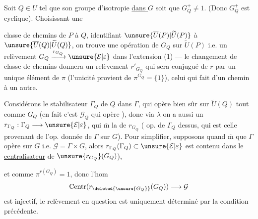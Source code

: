 Soit  $Q\in U$ tel que son groupe d'isotropie   \uline{dans $G$} soit  que $G_Q^+\ne1$.
(Donc $G_Q^+$ est cyclique). Choisissant une


classe de chemins \inserted{$\lambda$} de $P$ à $Q$, identifiant $\unsure{\overline U(P)|\widetilde U(P)}$ à $\unsure{\overline U(Q)|\widetilde U(Q)}$, on trouve une opération de $G_Q$ sur $\widetilde U(P)$ i.e. un relèvement $G_Q\xrightarrow{r_{G_Q}}\unsure{\mathcal E|\varepsilon}$ dans l'extension (1) --- le changement de classe de chemins  donnera un relèvement $r'_{G_Q}$ qui  sera conjugué de $r$ par un unique élément de $\pi$  (l'unicité provient de $\pi^{G_Q}=\{1\}$),  celui qui fait  d'un chemin à un autre.

Considérons le stabilisateur $\Gamma_Q$ de $Q$ dans $\Gamma$,  qui opère bien sûr sur $\widetilde U(Q)$ tout comme $G_Q$ (en fait c'est $\mathcal G_Q$ qui opère  \unsure{\dots}), donc via $\lambda$ on a aussi un  $r_{\Gamma_Q}:\Gamma_Q\longrightarrow\unsure{\mathcal E|\varepsilon}$, qui  $\overline{\mathrm m}$ la  de  $r_{G_Q}$ ( op. de  $\Gamma_Q$ dessus, qui est celle provenant de l'op. donnée de $\Gamma$ sur $G$).
Pour simplifier, supposons quand $\overline{\mathrm m}$ que $\Gamma$ opère  sur $G$ i.e. $\mathcal G=\Gamma\times G$, alors $r_{\Gamma_Q}(\Gamma_Q)\subset\unsure{\mathcal E|\varepsilon}$ est contenu dans le \uline{centralisateur} de  $\unsure{r_{G_Q}}(G_Q)$),


et comme $\pi^{r(G_Q)}=1$, donc l'hom
\[
\operatorname{Centr}(r_{\deleted{\unsure{G_Q}}}(G_Q))\longrightarrow\mathcal G
\]
est injectif, le relèvement en question  est uniquement déterminé par la condition précédente.

